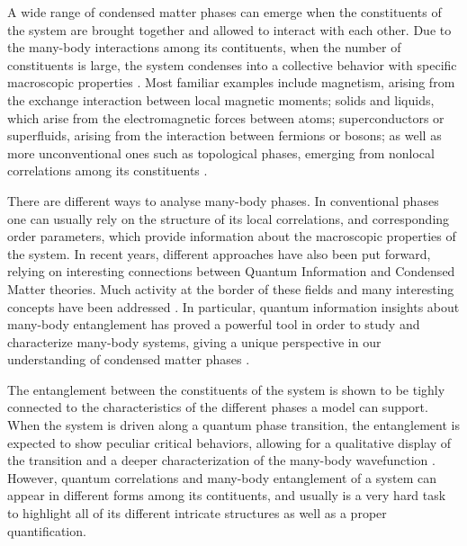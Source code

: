 \documentclass[prb,reprint,showpacs,twocolumn,superscriptaddress]{revtex4-2}
\begin{document}
A wide range of condensed matter phases can emerge when the constituents of the system are brought together and allowed to interact with each other. 
Due to the many-body interactions among its contituents, when the number of constituents is large, the system condenses into a collective behavior with specific macroscopic properties \cite{Fraser2006}.
Most familiar examples include magnetism, arising from the exchange interaction between local magnetic moments; solids and liquids, which arise from the electromagnetic forces between atoms; superconductors or superfluids, arising from the interaction between fermions or bosons; as well as more unconventional ones such as topological phases, emerging from nonlocal correlations among its constituents \cite{Xiao2013}.

There are different ways to analyse many-body phases.  
In conventional phases one can usually rely on the structure of its local correlations, and corresponding order parameters, which provide information about the macroscopic properties of the system. 
In recent years, different approaches have also been put forward, relying on interesting connections between Quantum Information and Condensed Matter theories. 
Much activity at the border of these fields and many interesting concepts have been addressed \cite{amico08}. 
In particular, quantum information insights about many-body entanglement has proved a powerful tool in order to study and characterize many-body systems, giving a unique perspective in our understanding of condensed matter phases \cite{BeiZeng2018}. 

The entanglement between the constituents of the system is shown to be tighly connected to the characteristics of the different phases a model can support. 
When the system is driven along a quantum phase transition, the entanglement is expected to show peculiar critical behaviors, allowing for a qualitative display of the transition and a deeper characterization of the many-body wavefunction \cite{amico08}.
However, quantum correlations and many-body entanglement of a system can appear in different forms among its contituents, and usually is a very hard task to highlight all of its different intricate structures as well as a proper quantification. 
\end{document}
